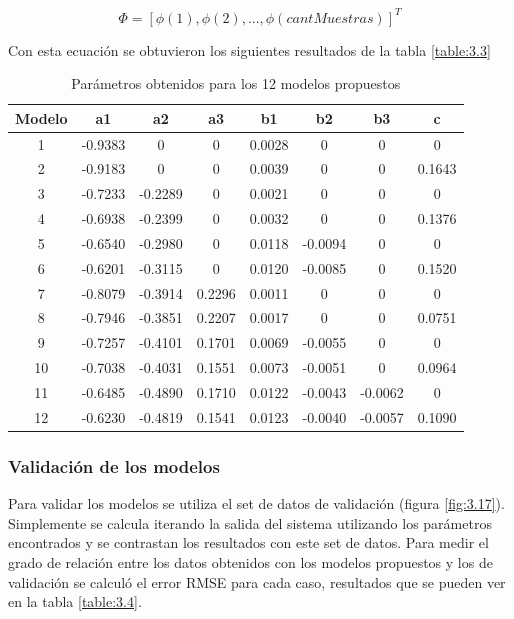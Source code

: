 \[ \Phi = [\phi(1),\phi(2),...,\phi(cantMuestras)]^T \]

Con esta ecuación se obtuvieron los siguientes resultados de la tabla \ref{table:3.3}

\begin{table}[!ht]
	\begin{center}
		
		\begin{tabular}{|c|c|c|c|c|c|c|c|}
			\hline
			\rowcolor{OODlightblue}
			Modelo & a1 & a2 & a3 & b1 & b2 & b3 & c   \\
			\hline \hline
			1 & -0.9383 & 0 & 0 & 0.0028 & 0 & 0 & 0 \\
			\hline
			2 & -0.9183 & 0 & 0 & 0.0039 & 0 & 0 & 0.1643 \\
			\hline
			3 & -0.7233 & -0.2289 & 0 & 0.0021 & 0 & 0 & 0 \\
			\hline
			4 & -0.6938 & -0.2399 & 0 & 0.0032 & 0 & 0 & 0.1376 \\
			\hline
			5 & -0.6540 & -0.2980 & 0 & 0.0118 & -0.0094 & 0 & 0 \\
			\hline
			6 & -0.6201 & -0.3115 & 0 & 0.0120 & -0.0085 & 0 & 0.1520 \\
			\hline
			7 & -0.8079 & -0.3914 & 0.2296 & 0.0011 & 0 & 0 & 0 \\
			\hline
			8 & -0.7946 & -0.3851 & 0.2207 & 0.0017 & 0 & 0 & 0.0751 \\
			\hline
			9 & -0.7257 & -0.4101 & 0.1701 & 0.0069 & -0.0055 & 0 & 0 \\
			\hline
			10 & -0.7038 & -0.4031 & 0.1551 & 0.0073 & -0.0051 & 0 & 0.0964 \\
			\hline
			11 & -0.6485 & -0.4890 & 0.1710 & 0.0122 & -0.0043 & -0.0062 & 0 \\
			\hline
			12 & -0.6230 & -0.4819 & 0.1541 & 0.0123 & -0.0040 & -0.0057 & 0.1090 \\
			\hline
		\end{tabular}
	\end{center}
	\caption{Parámetros obtenidos para los 12 modelos propuestos}
	\label{table:\thetable}
\end{table}


\subsubsection{Validación de los modelos}
Para validar los modelos se utiliza el set de datos de validación (figura \ref{fig:3.17}). Simplemente se calcula iterando la salida del sistema utilizando los parámetros encontrados y se contrastan los resultados con este set de datos. Para medir el grado de relación entre los datos obtenidos con los modelos propuestos y los de validación se calculó el error RMSE para cada caso, resultados que se pueden ver en la tabla \ref{table:3.4}.

